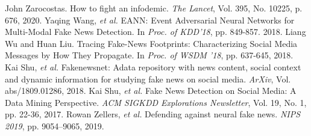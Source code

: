{	{\footnotesize 
	\begin{thebibliography}{99}
		\setlength{\parskip}{0cm}
		\setlength{\itemsep}{0cm}
		\begin{spacing}{0.7}
		 John Zarocostas. How to fight an infodemic. \textit{The Lancet}, Vol. 395, No. 10225, p. 676, 2020.
		 Yaqing Wang, \textit{et al.} EANN: Event Adversarial Neural Networks for Multi-Modal Fake News Detection. In \textit{Proc. of KDD'18}, pp. 849-857. 2018.
		 Liang Wu and Huan Liu. Tracing Fake-News Footprints: Characterizing Social Media Messages by How They Propagate. In \textit{Proc. of WSDM '18},  pp. 637-645, 2018.
		 Kai Shu, \textit{et al.} Fakenewsnet: Adata repository with news content, social context and dynamic information for studying fake news on social media. \textit{ArXiv}, Vol. abs/1809.01286, 2018.
		 Kai Shu, \textit{et al.} Fake News Detection on Social Media: A Data Mining Perspective. \textit{ACM SIGKDD Explorations Newsletter}, Vol. 19, No. 1, pp. 22-36, 2017.
		 Rowan Zellers, \textit{et al.} Defending against neural fake news. \textit{NIPS 2019}, pp. 9054–9065, 2019.
		\end{spacing}
	\end{thebibliography}
	}
}

